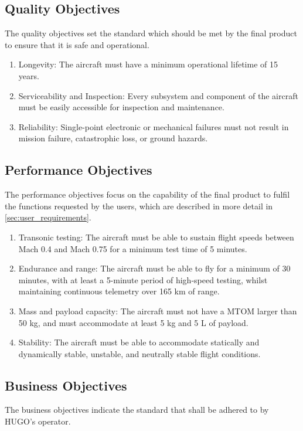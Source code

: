 \subsection{Quality Objectives}
The quality objectives set the standard which should be met by the final product to ensure that it is safe and operational.

\begin{enumerate}
    \item Longevity: The aircraft must have a minimum operational lifetime of 15 years.
    \item Serviceability and Inspection: Every subsystem and component of the aircraft must be easily accessible for inspection and maintenance.
    \item Reliability: Single-point electronic or mechanical failures must not result in mission failure, catastrophic loss, or ground hazards.
\end{enumerate}


\subsection{Performance Objectives}
The performance objectives focus on the capability of the final product to fulfil the functions requested by the users, which are described in more detail in \autoref{sec:user_requirements}.

\begin{enumerate}
    \item Transonic testing: The aircraft must be able to sustain flight speeds between Mach 0.4 and Mach 0.75 for a minimum test time of 5 minutes.
    \item Endurance and range: The aircraft must be able to fly for a minimum of 30 minutes, with at least a 5-minute period of high-speed testing, whilst maintaining continuous telemetry over 165 km of range.
    \item Mass and payload capacity: The aircraft must not have a MTOM larger than 50 kg, and must accommodate at least 5 kg and 5 L of payload.
    \item Stability: The aircraft must be able to accommodate statically and dynamically stable, unstable, and neutrally stable flight conditions.
\end{enumerate}

\subsection{Business Objectives}
The business objectives indicate the standard that shall be adhered to by HUGO's operator.


